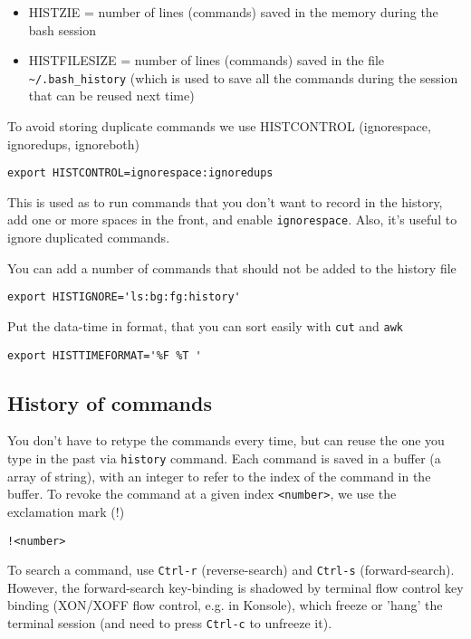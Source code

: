 \begin{itemize}
  \item HISTZIE = number of lines (commands) saved in the memory during the bash
  session
  \item HISTFILESIZE = number of lines (commands) saved in the file 
  \verb!~/.bash_history! (which is used to save all the commands during the
  session that can be reused next time)
\end{itemize}
To avoid storing duplicate commands we use HISTCONTROL (ignorespace,
ignoredups, ignoreboth)
\begin{verbatim}
export HISTCONTROL=ignorespace:ignoredups
\end{verbatim}
This is used as to run commands that you don't want to record in the history,
add one or more spaces in the front, and enable \verb!ignorespace!. Also, it's
useful to ignore duplicated commands.


You can add a number of commands that should not be added to the history file
\begin{verbatim}
export HISTIGNORE='ls:bg:fg:history'
\end{verbatim}

Put the data-time in format, that you can sort easily with \verb!cut! and
\verb!awk!
\begin{verbatim}
export HISTTIMEFORMAT='%F %T '
\end{verbatim}


\subsection{History of commands}

You don't have to retype the commands every time, but can reuse the one you type
in the past via \verb!history! command. Each command is saved in a buffer (a
array of string), with an integer to refer to the index of the command in the
buffer. To revoke the command at a given index \verb!<number>!, we use the
exclamation mark (!)
\begin{verbatim}
!<number>
\end{verbatim}

To search a command, use \verb!Ctrl-r! (reverse-search) and \verb!Ctrl-s!
(forward-search). However, the forward-search key-binding is shadowed by
terminal flow control key binding (XON/XOFF flow control, e.g. in Konsole),
which freeze or 'hang' the terminal session (and need to press \verb!Ctrl-c! to
unfreeze it). 

